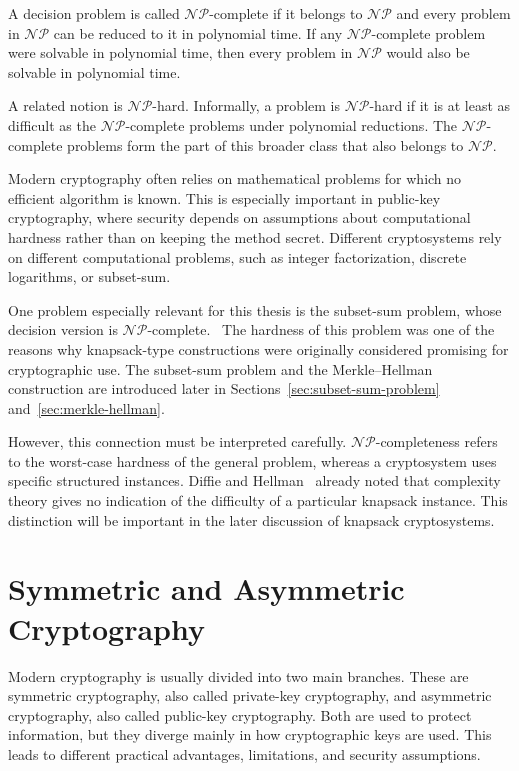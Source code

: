 A decision problem is called $\mathcal{NP}$-complete if it belongs to
$\mathcal{NP}$ and every problem in $\mathcal{NP}$ can be reduced to it in
polynomial time. If any $\mathcal{NP}$-complete problem were solvable in
polynomial time, then every problem in $\mathcal{NP}$ would also be solvable in
polynomial time.

A related notion is $\mathcal{NP}$-hard. Informally, a problem is
$\mathcal{NP}$-hard if it is at least as difficult as the
$\mathcal{NP}$-complete problems under polynomial reductions. The
$\mathcal{NP}$-complete problems form the part of this broader class that
also belongs to $\mathcal{NP}$.~\cite[pp.~34--35, 37]{garey1979computers}

Modern cryptography often relies on mathematical problems for which no
efficient algorithm is known. This is especially important in public-key
cryptography, where security depends on assumptions about computational
hardness rather than on keeping the method secret. Different cryptosystems rely
on different computational problems, such as integer factorization, discrete
logarithms, or subset-sum.

One problem especially relevant for this thesis is the subset-sum problem,
whose decision version is
$\mathcal{NP}$-complete.~\cite[p.~223]{garey1979computers} The hardness of
this problem was one of the reasons why knapsack-type constructions were
originally considered promising for cryptographic use. The subset-sum problem
and the Merkle--Hellman construction are introduced later in
Sections~\ref{sec:subset-sum-problem} and~\ref{sec:merkle-hellman}.

However, this connection must be interpreted carefully.
$\mathcal{NP}$-completeness refers to the worst-case hardness of the general
problem, whereas a cryptosystem uses specific structured instances. Diffie and
Hellman~\cite[p.~654]{diffie1976newDirections} already noted that complexity
theory gives no indication of the difficulty of a particular knapsack
instance. This distinction will be
important in the later discussion of knapsack cryptosystems.

\section{Symmetric and Asymmetric Cryptography}

Modern cryptography is usually divided into two main branches. These are
symmetric cryptography, also called private-key cryptography, and asymmetric
cryptography, also called public-key cryptography. Both are used to protect
information, but they diverge mainly in how cryptographic keys are used. This
leads to different practical advantages, limitations, and security assumptions.

